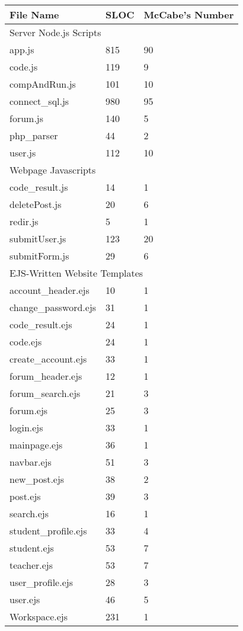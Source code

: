 \begin{tabular}{|l|l|l|}
  \hline
  File Name & SLOC & McCabe's Number\\
  \hline\hline
  \multicolumn{3}{l}{Server Node.js Scripts}\\
  \hline\hline
  app.js & 815 & 90\\
  \hline
  code.js & 119 & 9\\
  \hline
  compAndRun.js & 101 & 10\\
  \hline
  connect\_sql.js & 980 & 95\\
  \hline
  forum.js & 140 & 5\\
  \hline
  php\_parser & 44 & 2\\
  \hline
  user.js & 112 & 10\\
  \hline\hline
  \multicolumn{3}{l}{Webpage Javascripts}\\
  \hline\hline
  code\_result.js & 14 & 1\\
  \hline
  deletePost.js & 20 & 6\\
  \hline
  redir.js & 5 & 1\\
  \hline
  submitUser.js & 123 & 20\\
  \hline
  submitForm.js & 29 & 6\\
  \hline\hline
  \multicolumn{3}{l}{EJS-Written Website Templates}\\
  \hline\hline
  account\_header.ejs & 10 & 1\\
  \hline
  change\_password.ejs & 31 & 1\\
  \hline
  code\_result.ejs & 24 & 1\\
  \hline
  code.ejs & 24 & 1\\
  \hline
  create\_account.ejs & 33 & 1\\
  \hline
  forum\_header.ejs & 12 & 1\\
  \hline
  forum\_search.ejs & 21 & 3\\
  \hline
  forum.ejs & 25 & 3\\
  \hline
  login.ejs & 33 & 1\\
  \hline
  mainpage.ejs & 36 & 1\\
  \hline
  navbar.ejs & 51 & 3\\
  \hline
  new\_post.ejs & 38 & 2\\
  \hline
  post.ejs & 39 & 3\\
  \hline
  search.ejs & 16 & 1\\
  \hline
  student\_profile.ejs & 33 & 4\\
  \hline
  student.ejs & 53 & 7\\
  \hline
  teacher.ejs & 53 & 7\\
  \hline
  user\_profile.ejs & 28 & 3\\
  \hline
  user.ejs & 46 & 5 \\
  \hline
  Workspace.ejs & 231 & 1\\
  \hline
\end{tabular}

